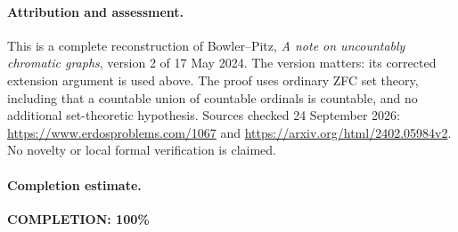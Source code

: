 \paragraph{Attribution and assessment.}
This is a complete reconstruction of Bowler--Pitz, \emph{A note on uncountably chromatic graphs}, version 2 of 17 May 2024. The version matters: its corrected extension argument is used above. The proof uses ordinary ZFC set theory, including that a countable union of countable ordinals is countable, and no additional set-theoretic hypothesis. Sources checked 24 September 2026: \url{https://www.erdosproblems.com/1067} and \url{https://arxiv.org/html/2402.05984v2}. No novelty or local formal verification is claimed.

\paragraph{Completion estimate.}
\textbf{COMPLETION: 100\%}
